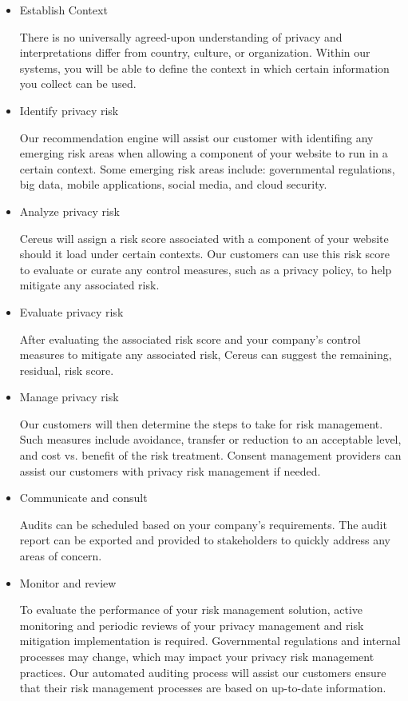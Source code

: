 \begin{itemize}

\item Establish Context

There is no universally agreed-upon understanding of privacy and interpretations differ from country, culture, or organization. Within our systems, you will be able to define the context in which certain information you collect can be used. 

\item Identify privacy risk

Our recommendation engine will assist our customer with identifing any emerging risk areas when allowing a component of your website to run in a certain context. Some emerging risk areas include: governmental regulations, big data, mobile applications, social media, and cloud security.

\item Analyze privacy risk

Cereus will assign a risk score associated with a component of your website should it load under certain contexts. Our customers can use this risk score to evaluate or curate any control measures, such as a privacy policy, to help mitigate any associated risk.

\item Evaluate privacy risk

After evaluating the associated risk score and your company's control measures to mitigate any associated risk, Cereus can suggest the remaining, residual, risk score.

\item Manage privacy risk

Our customers will then determine the steps to take for risk management. Such measures include avoidance, transfer or reduction to an acceptable level, and cost vs. benefit of the risk treatment. Consent management providers can assist our customers with privacy risk management if needed.

\item Communicate and consult

Audits can be scheduled based on your company's requirements. The audit report can be exported and provided to stakeholders to quickly address any areas of concern.

\item Monitor and review

To evaluate the performance of your risk management solution, active monitoring and periodic reviews of your privacy management and risk mitigation implementation is required. Governmental regulations and internal processes may change, which may impact your privacy risk management practices. Our automated auditing process will assist our customers ensure that their risk management processes are based on up-to-date information.

\end{itemize}


